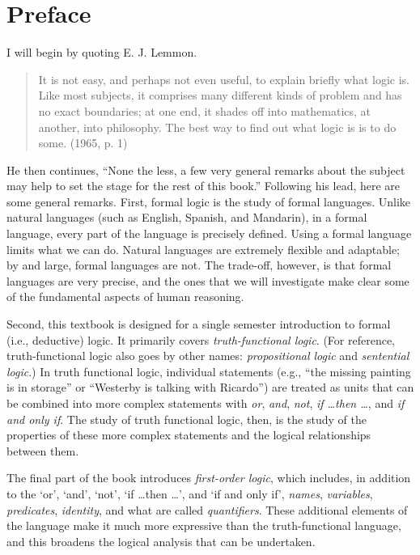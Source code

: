 \chapter{Preface}

I will begin by quoting E. J. Lemmon.
\begin{quote}
It is not easy, and perhaps not even useful, to explain briefly what logic is. Like most subjects, it comprises many different kinds of problem and has no exact boundaries; at one end, it shades off into mathematics, at another, into philosophy. The best way to find out what logic is is to do some. (1965, p. 1)
\end{quote}
He then continues, ``None the less, a few very general remarks about the subject may help to set the stage for the rest of this book.'' Following his lead, here are some general remarks. First, formal logic is the study of formal languages. Unlike natural languages (such as English, Spanish, and Mandarin), in a formal language, every part of the language is precisely defined. Using a formal language limits what we can do. Natural languages are extremely flexible and adaptable; by and large, formal languages are not. The trade-off, however, is that formal languages are very precise, and the ones that we will investigate make clear some of the fundamental aspects of human reasoning.

Second, this textbook is designed for a single semester introduction to formal (i.e., deductive) logic. It primarily covers \textit{truth-functional logic}. (For reference, truth-functional logic also goes by other names: \textit{propositional logic} and \textit{sentential logic}.) In truth functional logic, individual statements (e.g., ``the missing painting is in storage'' or ``Westerby is talking with Ricardo'') are treated as units that can be combined into more complex statements with  \textit{or}, \textit{and}, \textit{not}, \textit{if \ldots then \ldots}, and \textit{if and only if}. The study of truth functional logic, then, is the study of the properties of these more complex statements and the logical relationships between them. 

The final part of the book introduces \textit{first-order logic}, which includes, in addition to the ‘or’, ‘and’, ‘not’, ‘if \ldots then \ldots’, and `if and only if', \textit{names}, \textit{variables}, \textit{predicates}, \textit{identity}, and what are called \textit{quantifiers}. These additional elements of the language make it much more expressive than the truth-functional language, and this broadens the logical analysis that can be undertaken. 

